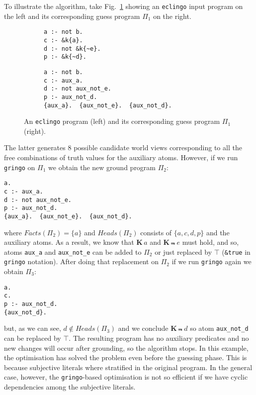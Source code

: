 \documentclass{new_tlp}
\def\K{\mathbf{K}\, }
\def\eclingo{{\tt eclingo}}
\def\bL{\K}
\def\Facts{\mathit{Facts}}
\def\Heads{\mathit{Heads}}
\begin{document}
To illustrate the algorithm, take Fig.~\ref{fig:p1} showing an \eclingo{} input program on the left and its corresponding guess program $\Pi_1$ on the right.
%
\begin{figure}[htbp]
\begin{subfigure}{.45\textwidth}
\begin{Verbatim}[frame=single]
a :- not b.
c :- &k{a}.
d :- not &k{~e}.
p :- &k{~d}.

\end{Verbatim}
\end{subfigure}
\begin{subfigure}{.45\textwidth}
\begin{Verbatim}[frame=single]
a :- not b.
c :- aux_a.
d :- not aux_not_e.
p :- aux_not_d.
{aux_a}.  {aux_not_e}.  {aux_not_d}.  
\end{Verbatim}
\end{subfigure}
\setlength{\abovecaptionskip}{5pt}
\caption{An \eclingo{} program (left) and its corresponding guess program $\Pi_1$ (right).}
\label{fig:p1}
\end{figure}
%
The latter generates 8 possible candidate world views corresponding to all the free combinations of truth values for the auxiliary atoms.
%
However, if we run {\tt gringo} on $\Pi_1$ we obtain the new ground program $\Pi_2$:
\begin{Verbatim}[frame=single]
a.
c :- aux_a.
d :- not aux_not_e.
p :- aux_not_d.
{aux_a}.  {aux_not_e}.  {aux_not_d}.  
\end{Verbatim}
where $\Facts(\Pi_2)=\{a\}$ and $\Heads(\Pi_2)$ consists of $\{a,c,d,p\}$ and the auxiliary atoms.
%
As a result, we know that $\bL a$ and $\bL \Not\; e$ must hold, and so, atoms {\tt aux\_a} and {\tt aux\_not\_e} can be added to $\Pi_2$ or just replaced by $\top$ ({\tt \&true} in {\tt gringo} notation).
%
After doing that replacement on $\Pi_2$ if we run {\tt gringo} again we obtain $\Pi_3$:
\begin{Verbatim}[frame=single]
a.
c.
p :- aux_not_d.
{aux_not_d}.
\end{Verbatim}
but, as we can see, $d \not\in \Heads(\Pi_3)$ and we conclude $\bL \Not \; d$ so atom {\tt aux\_not\_d} can be replaced by $\top$.
%
The resulting program has no auxiliary predicates and no new changes will occur after grounding, so the algorithm stops.
%
In this example, the optimisation has solved the problem even before the guessing phase.
%
This is because subjective literals where stratified in the original program.
%
In the general case, however, the {\tt gringo}-based optimisation is not so efficient if we have cyclic dependencies among the subjective literals.
\end{document}
